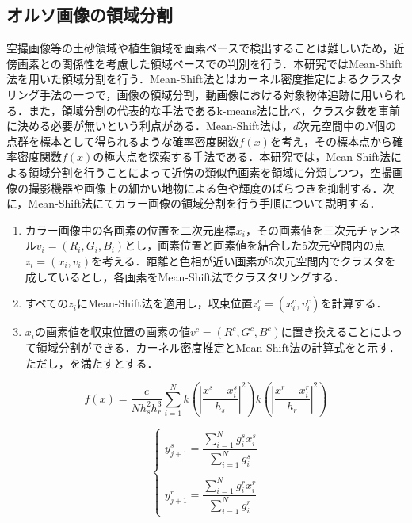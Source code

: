     \subsection{オルソ画像の領域分割}
      \label{オルソ画像の領域分割}
      空撮画像等の土砂領域や植生領域を画素ベースで検出することは難しいため，近傍画素との関係性を考慮した領域ベースでの判別を行う．本研究ではMean-Shift法\cite{Mean-Shift法1, Mean-Shift法2}を用いた領域分割を行う．Mean-Shift法とはカーネル密度推定によるクラスタリング手法の一つで，画像の領域分割，動画像における対象物体追跡に用いられる．また，領域分割の代表的な手法であるk-means法\cite{k-means法}に比べ，クラスタ数を事前に決める必要が無いという利点がある．Mean-Shift法は，$d$次元空間中の$N$個の点群を標本として得られるような確率密度関数$f(x)$を考え，その標本点から確率密度関数$f(x)$の極大点を探索する手法である．本研究では，Mean-Shift法による領域分割を行うことによって近傍の類似色画素を領域に分類しつつ，空撮画像の撮影機器や画像上の細かい地物による色や輝度のばらつきを抑制する．次に，Mean-Shift法にてカラー画像の領域分割を行う手順について説明する．

      \begin{enumerate}
        \setlength{\itemsep}{-5pt}
        \item カラー画像中の各画素の位置を二次元座標$x_i$，その画素値を三次元チャンネル$v_{i} =(R_{i},G_{i},B_{i})$とし，画素位置と画素値を結合した5次元空間内の点$z_{i} = (x_{i}, v_{i})$を考える．距離と色相が近い画素が5次元空間内でクラスタを成しているとし，各画素をMean-Shift法でクラスタリングする．
        \item すべての$z_{i}$にMean-Shift法を適用し，収束位置$z_{i}^c = (x_{i}^c, v_{i}^c)$を計算する．
        \item $x_{i}$の画素値を収束位置の画素の値$v^c = (R^c, G^c, B^c)$に置き換えることによって領域分割ができる．カーネル密度推定とMean-Shift法の計算式をと示す．ただし，を満たすとする．
      \end{enumerate}
    
      \begin{equation}
        \label{Mean-Shift法1}
        f(x) = \dfrac{c} {N h_{s}^2 h_{r}^3}
          \sum_{i=1}^{N}
          k (|\dfrac{x^s - x_{i}^s} {h_{s}}|^2) k (|\dfrac{x^r - x_{i}^r} {h_{r}}|^2)
      \end{equation}

      \begin{equation}
        \label{Mean-Shift法2}
        \left\{
          \begin{array}{l}
            y_{j+1}^s = 
              \dfrac{\sum_{i=1}^{N} g_{i}^s x_{i}^s} {\sum_{i=1}^{N} g_{i}^s} \\ \\
            y_{j+1}^r = 
              \dfrac{\sum_{i=1}^{N} g_{i}^r x_{i}^r} {\sum_{i=1}^{N} g_{i}^r}
          \end{array}
        \right.
      \end{equation}

